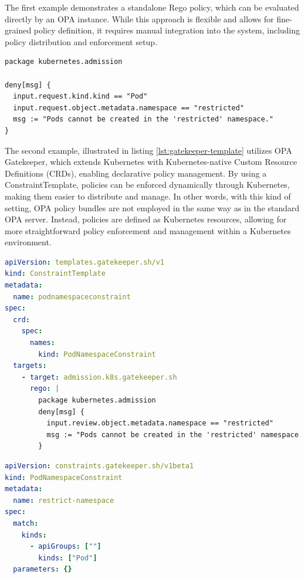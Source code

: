 The first example demonstrates a standalone Rego policy, which can be evaluated directly by an OPA instance. 
While this approach is flexible and allows for fine-grained policy definition, it requires manual integration into the system, including policy distribution and enforcement setup.  

\begin{lstlisting}[language=rego, caption={Simple OPA Rego Policy}, label={lst:opa-rego}]
package kubernetes.admission

deny[msg] {
  input.request.kind.kind == "Pod"
  input.request.object.metadata.namespace == "restricted"
  msg := "Pods cannot be created in the 'restricted' namespace."
}
\end{lstlisting}

The second example, illustrated in listing \ref{lst:gatekeeper-template} utilizes OPA Gatekeeper, which extends Kubernetes with Kubernetes-native Custom Resource Definitions (CRDs), enabling declarative policy management. By using a ConstraintTemplate, policies can be enforced dynamically through Kubernetes, making them easier to distribute and manage.
In other words, with this kind of setting, OPA policy bundles are not employed in the same way as in the standard OPA server. Instead, policies are defined as Kubernetes resources, allowing for more straightforward policy enforcement and management within a Kubernetes environment.

\begin{lstlisting}[language=yaml, caption={OPA Gatekeeper ConstraintTemplate}, label={lst:gatekeeper-template}]
apiVersion: templates.gatekeeper.sh/v1
kind: ConstraintTemplate
metadata:
  name: podnamespaceconstraint
spec:
  crd:
    spec:
      names:
        kind: PodNamespaceConstraint
  targets:
    - target: admission.k8s.gatekeeper.sh
      rego: |
        package kubernetes.admission
        deny[msg] {
          input.review.object.metadata.namespace == "restricted"
          msg := "Pods cannot be created in the 'restricted' namespace."
        }
\end{lstlisting}

\begin{lstlisting}[language=yaml, caption={OPA Gatekeeper Constraint}, label={lst:gatekeeper-constraint}, float=htpb]
apiVersion: constraints.gatekeeper.sh/v1beta1
kind: PodNamespaceConstraint
metadata:
  name: restrict-namespace
spec:
  match:
    kinds:
      - apiGroups: [""]
        kinds: ["Pod"]
  parameters: {}
\end{lstlisting}

